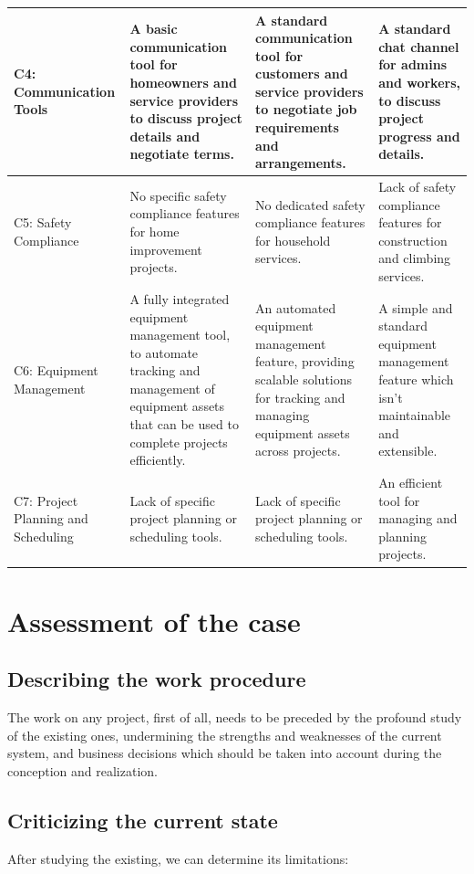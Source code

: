 \begin{longtable}{|p{2cm}|p{3.5cm}|p{3.5cm}|p{3.5cm}|}
    C4: Communication Tools & A basic communication tool for homeowners and service providers to discuss project details and negotiate terms. & A standard communication tool for customers and service providers to negotiate job requirements and arrangements. & A standard chat channel for admins and workers, to discuss project progress and details. \\
    \hline
    C5: Safety Compliance & No specific safety compliance features for home improvement projects. & No dedicated safety compliance features for household services. & Lack of safety compliance features for construction and climbing services. \\
    \hline
    C6: Equipment Management & A fully integrated equipment management tool, to automate tracking and  management of equipment assets that can be used to complete projects efficiently. & An automated equipment management feature, providing scalable solutions for tracking and managing equipment assets across projects. & A simple and standard equipment management feature which isn’t maintainable and extensible.\\
    \hline
    C7: Project Planning and Scheduling & Lack of specific project planning or scheduling tools. & Lack of specific project planning or scheduling tools. & An efficient tool for managing and planning projects. \\
    \hline
\end{longtable}

\section{Assessment of the case}
\subsection{Describing the work procedure}
The work on any project, first of all, needs to be preceded by the profound study of the existing ones, undermining the strengths and weaknesses of the current system, and business decisions which should be taken into account during the conception and realization.

\subsection{Criticizing the current state}
After studying the existing, we can determine its limitations:

